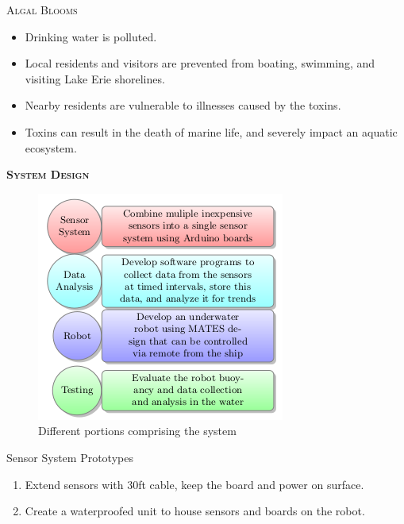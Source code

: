 \documentclass[final,t]{beamer}
\begin{document}
\begin{frame}{}
\begin{columns}
\begin{column}{.5\linewidth}
\begin{block}{\textsc{Algal Blooms}}
                \begin{itemize}
               		\item Drinking water is polluted.
					\item Local residents and visitors are prevented from boating, swimming, and visiting Lake Erie shorelines.
					\item Nearby residents are vulnerable to illnesses caused by the toxins. 
					\item Toxins can result in the death of marine life, and severely impact an aquatic ecosystem.
				\end{itemize}
                    \vspace*{3mm}
                \end{block}
                \begin{exampleblock}{\textsc{\textbf{System Design}}}
					   \begin{figure}
                    		\includegraphics[scale = 4]{assets/diagram}
                    	\caption{Different portions comprising the system}
                    	\end{figure}
  				
  					\begin{block}{Sensor System Prototypes}
                    \begin{enumerate}
    	                \item 
                    	Extend sensors with 30ft cable, keep the board and power on surface.
						\item  Create a waterproofed unit to house sensors and boards on the robot.
					\end{enumerate}
					

\end{block}
\end{exampleblock}
\end{column}
\end{columns}
\end{frame}
\end{document}
